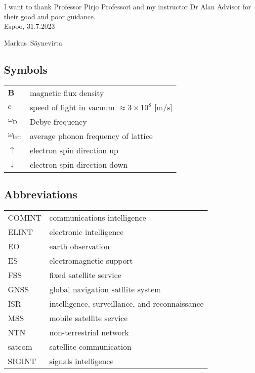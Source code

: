 \documentclass[english, 12pt, a4paper, elec, utf8, a-1b, online]{aaltothesis}
\begin{document}
I want to thank Professor Pirjo Professori and my instructor Dr Alan Advisor for 
their good and poor guidance.\\

\vspace{5cm}
Espoo, 31.7.2023

\vspace{5mm}
{\hfill Markus\ Säynevirta \hspace{1cm}}

\newpage

\thesistableofcontents


\subsection*{Symbols}

\begin{tabular}{ll}
$\mathbf{B}$  & magnetic flux density  \\
$c$              & speed of light in vacuum $\approx 3\times10^8$ [m/s]\\
$\omega_{\mathrm{D}}$    & Debye frequency \\
$\omega_{\mathrm{latt}}$ & average phonon frequency of lattice \\
$\uparrow$       & electron spin direction up\\
$\downarrow$     & electron spin direction down
\end{tabular}

\subsection*{Abbreviations}

\begin{tabular}{ll}
COMINT  & communications intelligence \\
ELINT   & electronic intelligence \\
EO      & earth observation \\
ES      & electromagnetic support \\
FSS     & fixed satellite service \\
GNSS    & global navigation satllite system \\
ISR     & intelligence, surveillance, and reconnaissance \\
MSS     & mobile satellite service \\
NTN     & non-terrestrial network \\
satcom  & satellite communication \\
SIGINT  & signals intelligence
\end{tabular}
\end{document}
